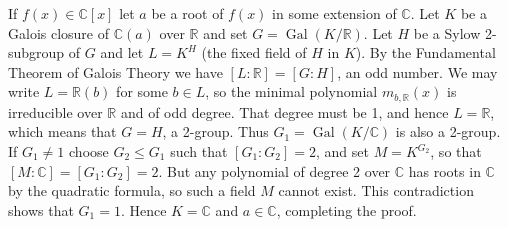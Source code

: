 \documentclass[12pt]{article}
\begin{document}
If $f(x) \in \mathbb{C}[x]$ let $a$ be a root of $f(x)$ in some
extension of $\mathbb{C}$. Let $K$ be a Galois closure of
$\mathbb{C}(a)$ over $\mathbb{R}$ and set $G = \operatorname{Gal}(K/\mathbb{R})$.
Let $H$ be a Sylow 2-subgroup of $G$ and let $L = K^H$ (the fixed field of $H$ in $K$).
By the Fundamental Theorem of Galois Theory we have
$[L:\mathbb{R}] = [G:H]$, an odd number. We may write $L =
\mathbb{R}(b)$ for some $b \in L$, so the minimal polynomial
$m_{b,\mathbb{R}}(x)$ is irreducible over $\mathbb{R}$ and of odd
degree. That degree must be 1, and hence $L = \mathbb{R}$, which
means that $G = H$, a 2-group. Thus $G_1 = \operatorname{Gal}(K/\mathbb{C})$ is also a 2-group. If $G_1 \ne 1$ choose $G_2
\le G_1$ such that $[G_1:G_2] = 2$, and set $M = K^{G_2}$,
so that $[M:\mathbb{C}] = [G_1:G_2] = 2$. But any polynomial of
degree 2 over $\mathbb{C}$ has roots in $\mathbb{C}$ by the
quadratic formula, so such a field $M$ cannot exist. This
contradiction shows that $G_1 = 1$. Hence $K = \mathbb{C}$ and $a
\in \mathbb{C}$, completing the proof.
\end{document}
